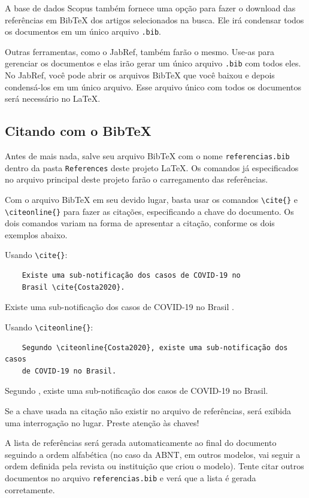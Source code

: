 A base de dados Scopus também fornece uma opção para fazer o download das referências em BibTeX dos artigos selecionados na busca. Ele irá condensar todos os documentos em um único arquivo \verb=.bib=.

Outras ferramentas, como o JabRef, também farão o mesmo. Use-as para gerenciar os documentos e elas irão gerar um único arquivo \verb=.bib= com todos eles. No JabRef, você pode abrir os arquivos BibTeX que você baixou e depois condensá-los em um único arquivo. Esse arquivo único com todos os documentos será necessário no \LaTeX.

\subsection{Citando com o BibTeX}
\label{subsec:citando_com_bibtex}

Antes de mais nada, salve seu arquivo BibTeX com o nome \verb=referencias.bib= dentro da pasta \verb=References= deste projeto \LaTeX. Os comandos já especificados no arquivo principal deste projeto farão o carregamento das referências.

Com o arquivo BibTeX em seu devido lugar, basta usar os comandos \verb=\cite{}= e \verb=\citeonline{}= para fazer as citações, especificando a chave do documento. Os dois comandos variam na forma de apresentar a citação, conforme os dois exemplos abaixo.

Usando \verb=\cite{}=:

\begin{verbatim}
    Existe uma sub-notificação dos casos de COVID-19 no
    Brasil \cite{Costa2020}.
\end{verbatim}

Existe uma sub-notificação dos casos de COVID-19 no Brasil \cite{Costa2020}.

Usando \verb=\citeonline{}=:

\begin{verbatim}
    Segundo \citeonline{Costa2020}, existe uma sub-notificação dos casos
    de COVID-19 no Brasil.
\end{verbatim}

Segundo , existe uma sub-notificação dos casos de COVID-19 no Brasil.

Se a chave usada na citação não existir no arquivo de referências, será exibida uma interrogação no lugar. Preste atenção às chaves!

A lista de referências será gerada automaticamente ao final do documento seguindo a ordem alfabética (no caso da ABNT, em outros modelos, vai seguir a ordem definida pela revista ou instituição que criou o modelo). Tente citar outros documentos no arquivo \verb=referencias.bib= e verá que a lista é gerada corretamente.

